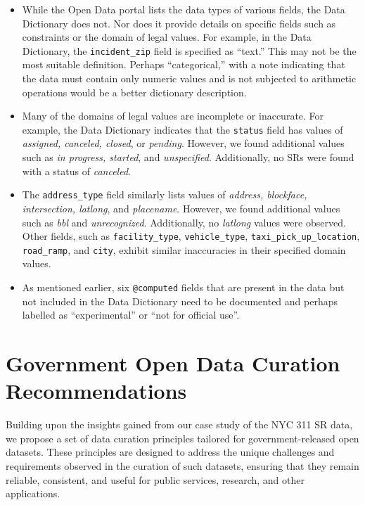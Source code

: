 \documentclass[linenumber]{jdsart}
\begin{document}
\begin{itemize}
    \item While the Open Data portal lists the data types of various 
    fields, the Data Dictionary does not. Nor does it provide details 
    on specific fields such as constraints or the domain of legal 
    values. For example, in the Data Dictionary, the \texttt{incident\_zip} 
    field is specified as ``text.'' This may not be the most suitable 
    definition. Perhaps ``categorical,'' with a note indicating that 
    the data must contain only numeric values and is not subjected to 
    arithmetic operations would be a better dictionary description.
    
    
    \item Many of the domains of legal values are incomplete or 
    inaccurate. For example, the Data Dictionary indicates that the 
    \texttt{status} field has values of \textit{assigned, canceled, 
    closed}, or \textit{pending}. However, we found additional
    values such as \textit{in progress, started}, and \textit{unspecified}. 
    Additionally, no SRs were found with a status of 
    \textit{canceled}. 
    
    
    \item The \texttt{address\_type} field similarly 
    lists values of \textit{address, blockface, intersection, latlong}, 
    and \textit{placename}. However, we found additional values such as 
    \textit{bbl} and \textit{unrecognized}. Additionally, no \textit{latlong} 
    values were observed. Other fields, such as \texttt{facility\_type}, 
    \texttt{vehicle\_type}, \texttt{taxi\_pick\_up\_location}, 
    \texttt{road\_ramp}, and \texttt{city}, exhibit similar inaccuracies 
    in their specified domain values.
    
    
	\item As mentioned earlier, six \texttt{@computed} fields that are
    present in the data but not included in the Data Dictionary need
    to be documented and perhaps labelled as ``experimental'' or
    ``not for official use''.
\end{itemize}


\section{Government Open Data Curation Recommendations}
\label{sec:recommendations}
Building upon the insights gained from our case study of the 
NYC 311 SR data, we propose a set of data 
curation principles tailored for government-released open datasets. 
These principles are designed to address the unique challenges 
and requirements observed in the curation of such datasets, 
ensuring that they remain reliable, consistent, and useful for 
public services, research, and other applications.
\end{document}
